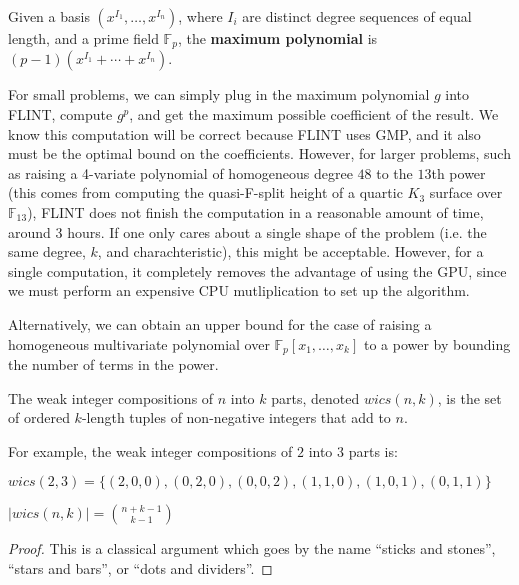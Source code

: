 \begin{defn}
    Given a basis $(x^{I_1}, \dots, x^{I_n})$, where $I_i$ are distinct degree sequences of equal length, and a prime field $\mathbb{F}_p$, the \textbf{maximum polynomial} is $(p - 1)(x^{I_1} + \cdots + x^{I_n})$.
\end{defn}

For small problems, we can simply plug in the maximum polynomial $g$ into FLINT, compute $g ^ p$, and 
get the maximum possible coefficient of the result.
We know this computation will be correct because FLINT uses GMP,
and it also must be the optimal bound on the coefficients. 
However, for larger problems, such as raising a 4-variate polynomial of homogeneous degree $48$ to the $13$th power (this comes from computing the quasi-F-split height of a quartic $K_3$ surface over $\mathbb{F}_{13}$), FLINT does not finish the computation in a reasonable amount of time, around 3 hours.
If one only cares about a single shape of the problem (i.e. the same degree, \(k\), and charachteristic),
this might be acceptable.
However, for a single computation, it completely removes the advantage of using the GPU,
since we must perform an expensive CPU mutliplication to set up the algorithm.

Alternatively, we can obtain an upper bound for the case of raising a homogeneous multivariate polynomial over $\mathbb{F}_p[x_1, \dots , x_k]$ to a power
by bounding the number of terms in the power. 

\begin{defn}
    The weak integer compositions of $n$ into $k$ parts, denoted $wics(n, k)$, is the set of ordered $k$-length tuples of non-negative integers that add to $n$.
\end{defn}

For example, the weak integer compositions of $2$ into $3$ parts is:
\begin{center}
    $wics(2, 3) = \lbrace (2, 0, 0), (0, 2, 0), (0, 0, 2), (1, 1, 0), (1, 0, 1), (0, 1, 1) \rbrace$
\end{center}

\begin{lem}
    $|wics(n, k)| = \binom{n + k - 1}{k - 1}$
\end{lem}

\begin{proof}
	This is a classical argument which goes by the name ``sticks and stones'', ``stars and bars'', or ``dots and dividers''.
\end{proof}

